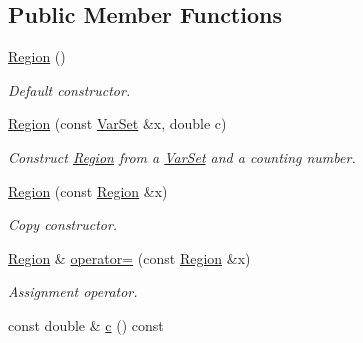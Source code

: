 \subsection*{Public Member Functions}
\begin{CompactItemize}
\item 
\hypertarget{classdai_1_1Region_a27111b83697a921dea2e6bb3ecb0222}{
\hyperlink{classdai_1_1Region_a27111b83697a921dea2e6bb3ecb0222}{Region} ()}
\label{classdai_1_1Region_a27111b83697a921dea2e6bb3ecb0222}

\begin{CompactList}\small\item\em Default constructor. \item\end{CompactList}\item 
\hypertarget{classdai_1_1Region_c34eb5c18da857db32b1b9154c5becd3}{
\hyperlink{classdai_1_1Region_c34eb5c18da857db32b1b9154c5becd3}{Region} (const \hyperlink{classdai_1_1VarSet}{VarSet} \&x, double c)}
\label{classdai_1_1Region_c34eb5c18da857db32b1b9154c5becd3}

\begin{CompactList}\small\item\em Construct \hyperlink{classdai_1_1Region}{Region} from a \hyperlink{classdai_1_1VarSet}{VarSet} and a counting number. \item\end{CompactList}\item 
\hypertarget{classdai_1_1Region_b656a0703493a71decd4cdd2644f2d3e}{
\hyperlink{classdai_1_1Region_b656a0703493a71decd4cdd2644f2d3e}{Region} (const \hyperlink{classdai_1_1Region}{Region} \&x)}
\label{classdai_1_1Region_b656a0703493a71decd4cdd2644f2d3e}

\begin{CompactList}\small\item\em Copy constructor. \item\end{CompactList}\item 
\hypertarget{classdai_1_1Region_cd6f39ea63fec1c7bff3705ca8f0b82d}{
\hyperlink{classdai_1_1Region}{Region} \& \hyperlink{classdai_1_1Region_cd6f39ea63fec1c7bff3705ca8f0b82d}{operator=} (const \hyperlink{classdai_1_1Region}{Region} \&x)}
\label{classdai_1_1Region_cd6f39ea63fec1c7bff3705ca8f0b82d}

\begin{CompactList}\small\item\em Assignment operator. \item\end{CompactList}\item 
\hypertarget{classdai_1_1Region_5364578c485508d3fff986545c378877}{
const double \& \hyperlink{classdai_1_1Region_5364578c485508d3fff986545c378877}{c} () const }
\label{classdai_1_1Region_5364578c485508d3fff986545c378877}


\end{CompactItemize}
